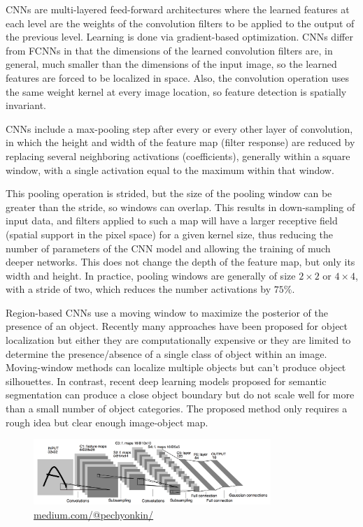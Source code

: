 CNNs are multi-layered feed-forward architectures where the learned features at each level are the weights of the convolution filters to be applied to the output of the previous level. Learning is done via gradient-based optimization. CNNs differ from FCNNs in that the dimensions of the learned convolution filters are, in general, much smaller than the dimensions of the input image, so the learned features are forced to be localized in space. Also, the convolution operation uses the same weight kernel at every image location, so feature detection is spatially invariant.

CNNs include a max-pooling step after every or every other layer of convolution, in which the height and width of the feature map (filter response) are reduced by replacing several neighboring activations (coefficients), generally within a square window, with a single activation equal to the maximum within that window. 

This pooling operation is strided, but the size of the pooling window can be greater than the stride, so windows can overlap. This results in down-sampling of input data, and filters applied to such a map will have a larger receptive field (spatial support in the pixel space) for a given kernel size, thus reducing the number of parameters of the CNN model and allowing the training of much deeper
networks. This does not change the depth of the feature map, but only its width and height. In practice, pooling windows are generally of size $2 \times 2$ or $4 \times 4$, with a stride of two, which reduces the number activations by $75 \%$.

Region-based CNNs use a moving window to maximize the posterior of the presence of an object. Recently many approaches have been proposed for object localization but either they are computationally expensive or they are limited to determine the presence/absence of a single class of object within an image. Moving-window methods can localize multiple objects but can't produce object silhouettes. In contrast, recent deep learning models proposed for semantic segmentation can produce a close object boundary but do not scale well for more than a small number of object categories. The proposed method only requires a rough idea but clear enough image-object map.

\vspace{2em}

\begin{figure}[!ht]
    \centering
    \includegraphics[width=0.80\textwidth]{fig/4-2.png}
    {\href{https://medium.com/@pechyonkin/key-deep-learning-architectures-lenet-5-6fc3c59e6f4}{medium.com/@pechyonkin/}}
    \label{fig:LeNet}
\end{figure}

